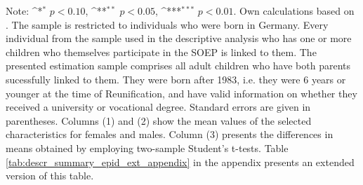 \documentclass[a4paper, oneside, hyperfootnotes = false]{article}
\def\sym#1{\ifmmode^{#1}\else\(^{#1}\)\fi}
\begin{document}
{\begin{table}[ht]
\begin{center}
		\vspace{2mm}
		
		\parbox{10cm}{
			\linespread{1}\footnotesize Note: \sym{*} \(p<0.10\), \sym{**} \(p<0.05\), \sym{***} \(p<0.01\). Own calculations based on \cite{SOEP2023}. The sample is restricted to individuals who were born in Germany. Every individual from the sample used in the descriptive analysis who has one or more children who themselves participate in the SOEP is linked to them. The presented estimation sample comprises all adult children who have both parents sucessfully linked to them. They were born after 1983, i.e. they were 6 years or younger at the time of Reunification, and have valid information on whether they received a university or vocational degree. Standard errors are given in parentheses. Columns (1) and (2) show the mean values of the selected characteristics for females and males. Column (3) presents the differences in means obtained by employing two-sample Student's t-tests. Table \ref{tab:descr_summary_epid_ext_appendix} in the appendix presents an extended version of this table.}
		
	\end{center}
\end{table}

}
\end{document}
